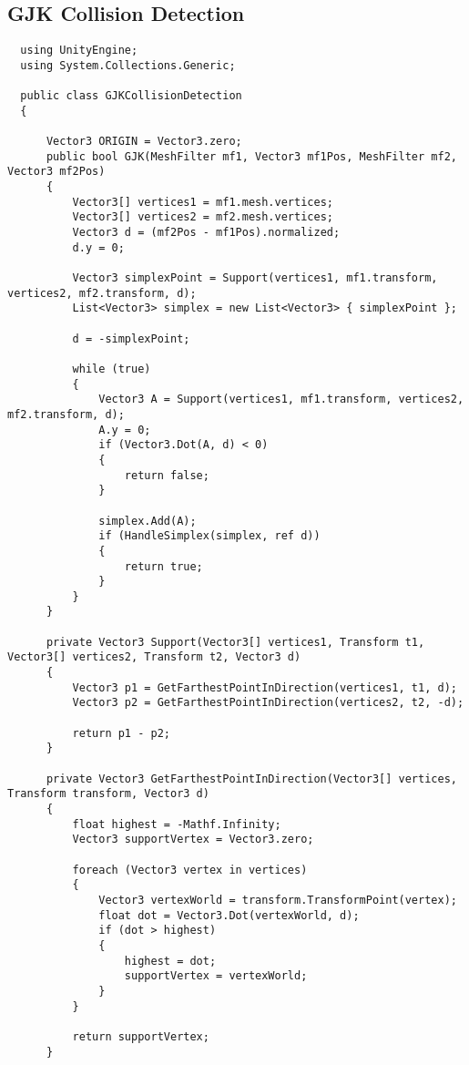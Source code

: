 \subsection{GJK Collision Detection}\label{sec:gjk}
\begin{lstlisting}
  using UnityEngine;
  using System.Collections.Generic;
  
  public class GJKCollisionDetection
  { 
  
      Vector3 ORIGIN = Vector3.zero;
      public bool GJK(MeshFilter mf1, Vector3 mf1Pos, MeshFilter mf2, Vector3 mf2Pos)
      {
          Vector3[] vertices1 = mf1.mesh.vertices;
          Vector3[] vertices2 = mf2.mesh.vertices;
          Vector3 d = (mf2Pos - mf1Pos).normalized;
          d.y = 0;
  
          Vector3 simplexPoint = Support(vertices1, mf1.transform, vertices2, mf2.transform, d);
          List<Vector3> simplex = new List<Vector3> { simplexPoint };
  
          d = -simplexPoint;
  
          while (true)
          {
              Vector3 A = Support(vertices1, mf1.transform, vertices2, mf2.transform, d);
              A.y = 0;
              if (Vector3.Dot(A, d) < 0)
              {
                  return false;
              }
  
              simplex.Add(A);
              if (HandleSimplex(simplex, ref d))
              {
                  return true;
              }
          }
      }
  
      private Vector3 Support(Vector3[] vertices1, Transform t1, Vector3[] vertices2, Transform t2, Vector3 d)
      {
          Vector3 p1 = GetFarthestPointInDirection(vertices1, t1, d);
          Vector3 p2 = GetFarthestPointInDirection(vertices2, t2, -d);
  
          return p1 - p2;
      }
  
      private Vector3 GetFarthestPointInDirection(Vector3[] vertices, Transform transform, Vector3 d)
      {
          float highest = -Mathf.Infinity;
          Vector3 supportVertex = Vector3.zero;
  
          foreach (Vector3 vertex in vertices)
          {
              Vector3 vertexWorld = transform.TransformPoint(vertex);
              float dot = Vector3.Dot(vertexWorld, d);
              if (dot > highest)
              {
                  highest = dot;
                  supportVertex = vertexWorld;
              }
          }
  
          return supportVertex;
      }
  

\end{lstlisting}
